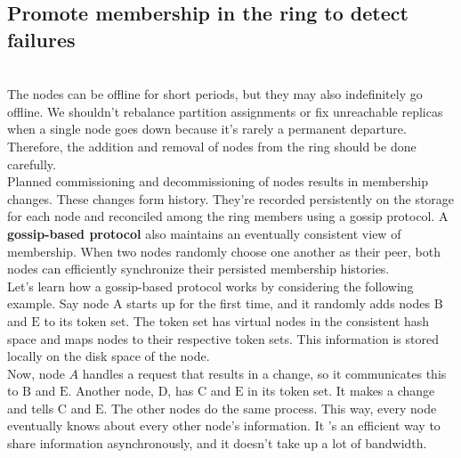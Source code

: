 \subsection{Promote membership in the ring to detect failures}\label{D8V_cWDRynizFLCTbPeCo}
\\
The nodes can be offline for short periods, but they may also indefinitely go offline. We shouldn't rebalance partition assignments or fix unreachable replicas when a single node goes down because it's rarely a permanent departure. Therefore, the addition and removal of nodes from the ring should be done carefully.
\\
Planned commissioning and decommissioning of nodes results in membership changes. These changes form history. They're recorded persistently on the storage for each node and reconciled among the ring members using a gossip protocol. A \textbf{gossip-based protocol} also maintains an eventually consistent view of membership. When two nodes randomly choose one another as their peer, both nodes can efficiently synchronize their persisted membership histories.
\\
Let's learn how a gossip-based protocol works by considering the following example. Say node \protect{}\label{katex_inline_S13mWOR2eFyFLKmAanO2N}{{{\(\text{A}\)}}} starts up for the first time, and it randomly adds nodes \protect{}\label{katex_inline_pMnthC8F4XPbizayuwcf8}{{{\(\text{B}\)}}} and \protect{}\label{katex_inline_NgYT-vyVw1faYB5WEfBc5}{{{\(\text{E}\)}}} to its token set. The token set has virtual nodes in the consistent hash space and maps nodes to their respective token sets. This information is stored locally on the disk space of the node.
\\
Now, node \protect{}\label{katex_inline_Gt--C6KlJ90b1DI85RePc}{{{\(A\)}}} handles a request that results in a change, so it communicates this to \protect{}\label{katex_inline_vKaqsG92O9i8gPEX0ID5y}{{{\(\text{B}\)}}} and \protect{}\label{katex_inline_sU1P6G8auGo0OWV2wtZ01}{{{\(\text{E}\)}}}. Another node, \protect{}\label{katex_inline_2R8sV8HKp35CgmHx0YNAs}{{{\(\text{D}\)}}}, has \protect{}\label{katex_inline_kEmeHuaJaV9tcp8fNmrGx}{{{\(\text{C}\)}}} and \protect{}\label{katex_inline_SyzGgfR_SWsgP8mbigClw}{{{\(\text{E}\)}}} in its token set. It makes a change and tells \protect{}\label{katex_inline_fc1naNqSua2loNqOlfh6u}{{{\(\text{C}\)}}} and \protect{}\label{katex_inline_Z8Ul6WVnS5RA5EwYwVMQ0}{{{\(\text{E}\)}}}. The other nodes do the same process. This way, every node eventually knows about every other node's information. It 's an efficient way to share information asynchronously, and it doesn't take up a lot of bandwidth.

